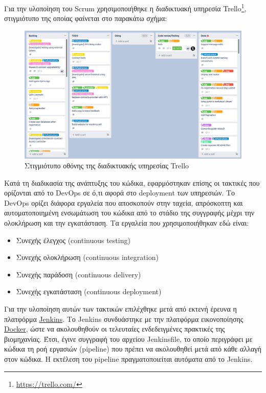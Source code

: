 Για την υλοποίηση του Scrum χρησιμοποιήθηκε η διαδικτυακή υπηρεσία Trello\footnote{\url{https://trello.com/}}, στιγμιότυπο της οποίας φαίνεται στο παρακάτω σχήμα:

\vspace{.25\baselineskip}

\begin{figure}[H]
    \centering
    \includegraphics[width=\textwidth]{assets/figures/chapter-4/4.1.implementation-methodology-kanban.png}
    \caption{Στιγμιότυπο οθόνης της διαδικτυακής υπηρεσίας Trello}
    \label{figure:4.1.implementation-methodology-kanban}
\end{figure}

Κατά τη διαδικασία της ανάπτυξης του κώδικα, εφαρμόστηκαν επίσης οι τακτικές που ορίζονται από το DevOps σε ό,τι αφορά στο deployment των υπηρεσιών. Το DevOps ορίζει διάφορα εργαλεία που αποσκοπούν στην ταχεία, απρόσκοπτη και αυτοματοποιημένη ενσωμάτωση του κώδικα από το στάδιο της συγγραφής μέχρι την ολοκλήρωση και την εγκατάσταση. Τα εργαλεία που χρησιμοποιήθηκαν εδώ είναι:

\begin{itemize}
    \item Συνεχής έλεγχος (continuous testing)
    \item Συνεχής ολοκλήρωση (continuous integration)
    \item Συνεχής παράδοση (continuous delivery)
    \item Συνεχής εγκατάσταση (continuous deployment)
\end{itemize}

Για την υλοποίηση αυτών των τακτικών επιλέχθηκε μετά από εκτενή έρευνα η πλατφόρμα \hyperref[subsection:4-2-1-3-jenkins]{Jenkins}. Το Jenkins συνδυάστηκε με την πλατφόρμα εικονοποίησης \hyperref[subsection:4-2-1-2-docker]{Docker}, ώστε να ακολουθηθούν οι τελευταίες ενδεδειγμένες πρακτικές της βιομηχανίας. Έτσι, έγινε συγγραφή του αρχείου Jenkinsfile, το οποίο περιγράφει με κώδικα τη ροή εργασιών (pipeline) που πρέπει να ακολουθηθεί μετά από κάθε αλλαγή στον κώδικα. Η εκτέλεση του pipeline πραγματοποιείται αυτόματα από το Jenkins.

